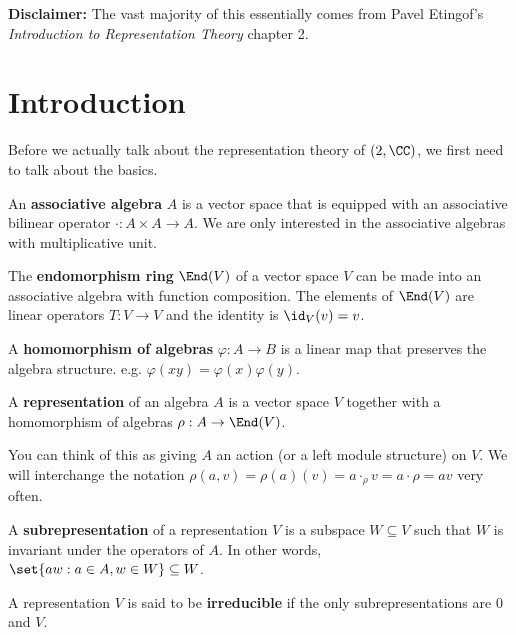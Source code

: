 \documentclass{article}
\begin{document}
\textbf{Disclaimer:} The vast majority of this essentially comes from Pavel
Etingof's \textit{Introduction to Representation Theory} chapter 2.

\section{Introduction}
Before we actually talk about the representation theory of $\sl(2, \CC)$, we
first need to talk about the basics.

\begin{df}
An \textbf{associative algebra} $A$ is a vector space that is equipped with an
associative bilinear operator $\cdot : A \times A \to A$. We are only interested
in the associative algebras with multiplicative unit.
\end{df}

\begin{ex}
The \textbf{endomorphism ring} $\End(V)$ of a vector space $V$ can be made into
an associative algebra with function composition. The elements of $\End(V)$ are
linear operators $T : V \to V$ and the identity is $\id_V(v) = v$.
\end{ex}

\begin{df}
A \textbf{homomorphism of algebras} $\varphi : A \to B$ is a linear map that
preserves the algebra structure. e.g. $\varphi(xy) = \varphi(x) \varphi(y)$.
\end{df}

\begin{df}
A \textbf{representation} of an algebra $A$ is a vector space $V$ together with
a homomorphism of algebras $\rho : A \to \End(V)$.

You can think of this as giving $A$ an action (or a left module structure) on
$V$. We will interchange the notation $\rho(a, v) = \rho(a)(v) = a \cdot_{\rho}
v = a \cdot \rho = av$ very often.
\end{df}

\begin{df}
A \textbf{subrepresentation} of a representation $V$ is a subspace $W \subseteq
V$ such that $W$ is invariant under the operators of $A$. In other words,
$\set{aw : a \in A, w \in W} \subseteq W$.
\end{df}

\begin{df}
A representation $V$ is said to be \textbf{irreducible} if the only
subrepresentations are $0$ and $V$.
\end{df}
\end{document}
